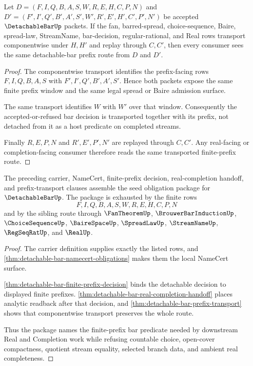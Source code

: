 \begin{theorem}
\label{thm:detachable-bar-prefix-transport}
Let $D=(F,I,Q,B,A,S,W,R,E,H,C,P,N)$ and $D'=(F',I',Q',B',A',S',W',R',E',H',C',P',N')$ be accepted $\DetachableBarUp$ packets. If the fan, barred-spread, choice-sequence, Baire, spread-law, StreamName, bar-decision, regular-rational, and Real rows transport componentwise under $H,H'$ and replay through $C,C'$, then every consumer sees the same detachable-bar prefix route from $D$ and $D'$.
\end{theorem}
\begin{proof}
The componentwise transport identifies the prefix-facing rows $F,I,Q,B,A,S$ with $F',I',Q',B',A',S'$. Hence both packets expose the same finite prefix window and the same legal spread or Baire admission surface.

The same transport identifies $W$ with $W'$ over that window. Consequently the accepted-or-refused bar decision is transported together with its prefix, not detached from it as a host predicate on completed streams.

Finally $R,E,P,N$ and $R',E',P',N'$ are replayed through $C,C'$. Any real-facing or completion-facing consumer therefore reads the same transported finite-prefix route.
\end{proof}

\begin{theorem}
\label{thm:detachable-bar-obligation-package}
The preceding carrier, NameCert, finite-prefix decision, real-completion handoff, and prefix-transport clauses assemble the seed obligation package for $\DetachableBarUp$. The package is exhausted by the finite rows
$$
F,I,Q,B,A,S,W,R,E,H,C,P,N
$$
and by the sibling route through $\FanTheoremUp$, $\BrouwerBarInductionUp$, $\ChoiceSequenceUp$, $\BaireSpaceUp$, $\SpreadLawUp$, $\StreamNameUp$, $\RegSeqRatUp$, and $\RealUp$.
\end{theorem}
\begin{proof}
The carrier definition supplies exactly the listed rows, and \autoref{thm:detachable-bar-namecert-obligations} makes them the local NameCert surface.

\autoref{thm:detachable-bar-finite-prefix-decision} binds the detachable decision to displayed finite prefixes. \autoref{thm:detachable-bar-real-completion-handoff} places analytic readback after that decision, and \autoref{thm:detachable-bar-prefix-transport} shows that componentwise transport preserves the whole route.

Thus the package names the finite-prefix bar predicate needed by downstream Real and Completion work while refusing countable choice, open-cover compactness, quotient stream equality, selected branch data, and ambient real completeness.
\end{proof}

